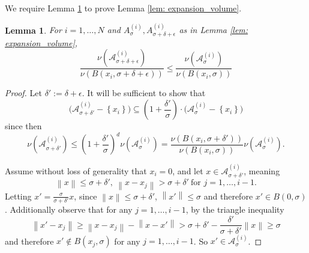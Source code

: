 \documentclass{article}
\newcommand{\set}[1]{\left\{#1\right\}}
\newcommand{\norm}[1]{\left\lVert#1\right\rVert}
\newcommand{\1}{\mathbf{1}}
\newcommand{\Aset}{\mathcal{A}}
\newcommand{\Asig}{\Aset_{\sigma}}
\theoremstyle{aldenthm}
\newtheorem{lemma}{Lemma}
\theoremstyle{aldenrmrk}
\begin{document}
We require Lemma \ref{lem: covering} to prove Lemma \ref{lem: expansion_volume}.

\begin{lemma}
	\label{lem: covering}
	For $i = 1, \ldots, N$ and  $A_{\sigma}^{(i)}, A_{\sigma + \delta + \epsilon}^{(i)}$ as in Lemma \ref{lem: expansion_volume},
	\begin{equation*}
	\frac{\nu(\Aset_{\sigma + \delta + \epsilon}^{(i)})}{\nu(B(x_i, \sigma + \delta + \epsilon))} \leq \frac{\nu(\Aset_{\sigma}^{(i)})}{\nu(B(x_i, \sigma))}
	\end{equation*}
\end{lemma}
\begin{proof}
	Let $\delta' := \delta + \epsilon$. It will be sufficient to show that
	\begin{equation*}
	\biggl(\Aset_{\sigma + \delta'}^{(i)} - \set{x_i}\biggr) \subseteq \left(1 + \frac{\delta'}{\sigma}\right)\cdot\biggl(\Asig^{(i)} - \set{x_i}\biggr) 
	\end{equation*}
	since then
	\begin{equation*}
	\nu(\Aset_{\sigma + \delta'}^{(i)}) \leq \left(1 + \frac{\delta'}{\sigma}\right)^d \nu(\Aset_{\sigma}^{(i)}) = \frac{\nu(B(x_i, \sigma + \delta'))}{\nu(B(x_i, \sigma))} \nu(\Aset_{\sigma}^{(i)}).
	\end{equation*}
	
	Assume without loss of generality that $x_i = 0$, and let $x \in \Aset_{\sigma + \delta'}^{(i)}$, meaning
	\begin{equation}
	\norm{x} \leq \sigma + \delta',~ \norm{x - x_j} > \sigma + \delta'~ \textrm{for $j = 1, \ldots, i - 1$}.
	\end{equation}
	Letting $x' = \frac{\sigma}{\sigma + \delta'} x$, since $\norm{x} \leq \sigma + \delta'$, $\norm{x'} \leq \sigma$ and therefore $x' \in B(0,\sigma)$. Additionally observe that for any $j = 1, \ldots, i - 1$, by the triangle inequality
	\begin{equation*}
	\norm{x' - x_j} \geq \norm{x - x_j} - \norm{x - x'} > \sigma + \delta' - \frac{\delta'}{\sigma + \delta'}\norm{x} \geq \sigma
	\end{equation*}
	and therefore $x' \not\in B(x_j,\sigma)$ for any $j = 1,\ldots, i - 1$. So $x' \in \Asig^{(i)}$.
\end{proof}
\end{document}

